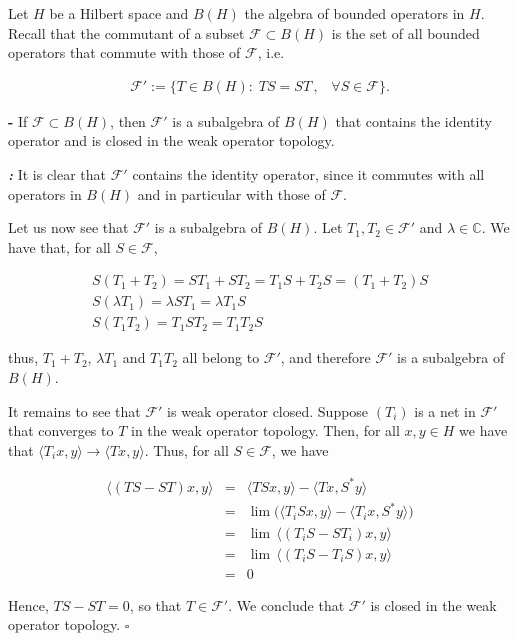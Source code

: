 \documentclass[12pt]{article}
\begin{document}
Let $H$ be a Hilbert space and $B(H)$ the algebra of bounded operators in $H$. Recall that the commutant of a subset $\mathcal{F} \subset B(H)$ is the set of all bounded operators that commute with those of $\mathcal{F}$, i.e.

\begin{align*}
\mathcal{F}':=\{T \in B(H):\; TS=ST \,,\;\;\; \forall S \in \mathcal{F}\}.
\end{align*}

{\bf {} -} If $\mathcal{F} \subset B(H)$, then $\mathcal{F}'$ is a subalgebra of $B(H)$ that contains the identity operator and is closed in the weak operator topology.

{\bf \emph{:}} It is clear that $\mathcal{F}'$ contains the identity operator, since it commutes with all operators in $B(H)$ and in particular with those of $\mathcal{F}$.

Let us now see that $\mathcal{F}'$ is a subalgebra of $B(H)$. Let $T_1, T_2 \in \mathcal{F}'$ and $\lambda \in \mathbb{C}$. We have that, for all $S \in \mathcal{F}$,

\begin{align*}
S(T_1+T_2)= ST_1 + ST_2 = T_1S + T_2S = (T_1+T_2)S\\
S(\lambda T_1) = \lambda ST_1 = \lambda T_1 S\\
S(T_1T_2) = T_1ST_2 = T_1T_2S
\end{align*}

thus, $T_1 +T_2$, $\lambda T_1$ and $T_1T_2$ all belong to $\mathcal{F}'$, and therefore $\mathcal{F}'$ is a subalgebra of $B(H)$.

It remains to see that $\mathcal{F}'$ is weak operator closed. Suppose $(T_i)$ is a net in $\mathcal{F}'$ that converges to $T$ in the weak operator topology. Then, for all $x, y \in H$ we have that $\langle T_ix, y \rangle \to \langle Tx,y\rangle$. Thus, for all $S \in \mathcal{F}$, we have

\begin{eqnarray*}
\langle (TS - ST)x, y \rangle & = & \langle TSx, y \rangle - \langle Tx, S^*y \rangle \\
& = & \lim \big( \langle T_iSx, y \rangle - \langle T_ix, S^*y \rangle \big)\\
& = & \lim \, \langle (T_iS - ST_i)x, y \rangle\\
& = & \lim\, \langle (T_iS - T_iS)x, y \rangle\\
& = & 0
\end{eqnarray*}

Hence, $TS-ST=0$, so that $T \in \mathcal{F}'$. We conclude that $\mathcal{F}'$ is closed in the weak operator topology. $\square$
\end{document}
